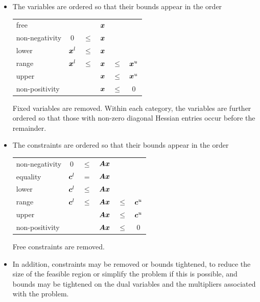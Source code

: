 \documentclass{galahad}
\begin{document}
\begin{itemize}
\item The variables are ordered so that their bounds appear in the order
\begin{center}
\begin{tabular}{lccccc}
free                &          &        & ${\bm{x}}$ &        &          \\
non-negativity      &   0      & $\leq$ & ${\bm{x}}$ &        &          \\
lower               & ${\bm{x}}^l$ & $\leq$ & ${\bm{x}}$ &        &          \\
range               & ${\bm{x}}^l$ & $\leq$ & ${\bm{x}}$ & $\leq$ & ${\bm{x}}^u$ \\
upper               &          &        & ${\bm{x}}$ & $\leq$ & ${\bm{x}}^u$ \\
non-positivity      &          &        & ${\bm{x}}$ & $\leq$ &      0   \\
\end{tabular}
\end{center}

Fixed variables are removed. Within each category, the variables
are further ordered so that those with non-zero diagonal Hessian
entries occur before the remainder.

\item
The constraints are ordered so that their bounds appear in the order
\begin{center}
\begin{tabular}{lccccc}
non-negativity      &     0    & $\leq$ & ${\bm{A}} {\bm{x}}$ &        &          \\
equality            & ${\bm{c}}^l$ &   $=$  & ${\bm{A}} {\bm{x}}$ &        &          \\
lower               & ${\bm{c}}^l$ & $\leq$ & ${\bm{A}} {\bm{x}}$ &        &          \\
range               & ${\bm{c}}^l$ & $\leq$ & ${\bm{A}} {\bm{x}}$ & $\leq$ & ${\bm{c}}^u$ \\
upper               &          &        & ${\bm{A}} {\bm{x}}$ & $\leq$ & ${\bm{c}}^u$ \\
non-positivity      &          &        & ${\bm{A}} {\bm{x}}$ & $\leq$ &     0    \\
\end{tabular}
\end{center}
Free constraints are removed.

\item
In addition, constraints may be removed or bounds tightened, to reduce the
size of the feasible region or simplify the problem if this is possible, and
bounds may be tightened on the dual variables and the multipliers
associated  with the problem.
\end{itemize}
\end{document}
